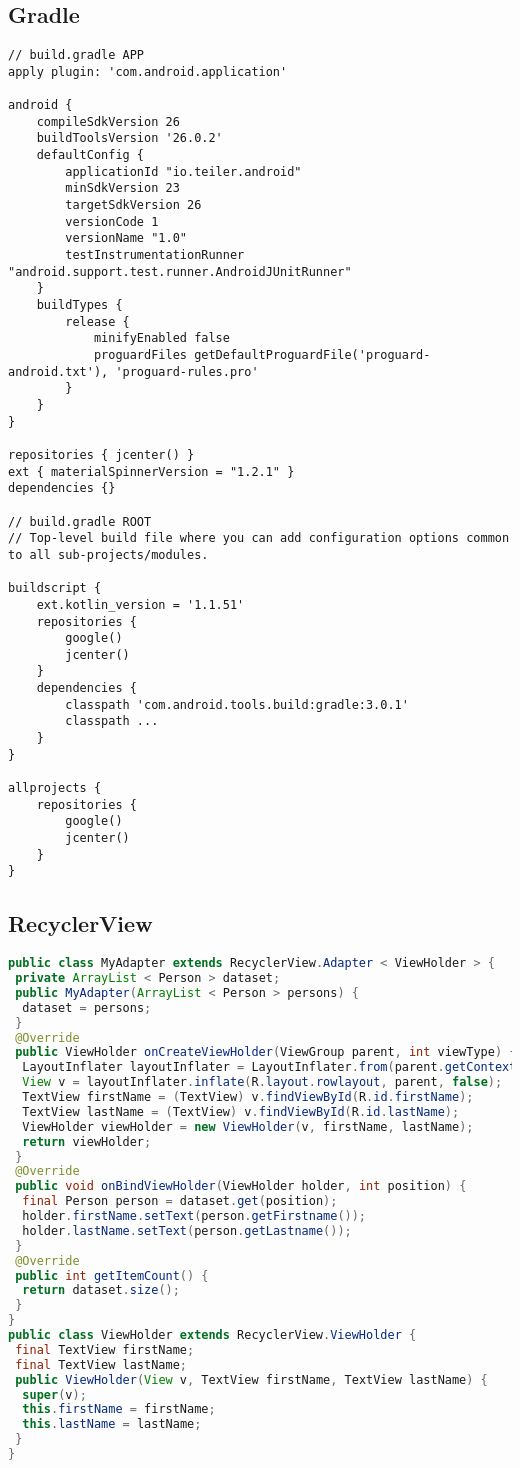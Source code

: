 \subsection{Gradle}

\begin{lstlisting}
// build.gradle APP
apply plugin: 'com.android.application'

android {
    compileSdkVersion 26
    buildToolsVersion '26.0.2'
    defaultConfig {
        applicationId "io.teiler.android"
        minSdkVersion 23
        targetSdkVersion 26
        versionCode 1
        versionName "1.0"
        testInstrumentationRunner "android.support.test.runner.AndroidJUnitRunner"
    }
    buildTypes {
        release {
            minifyEnabled false
            proguardFiles getDefaultProguardFile('proguard-android.txt'), 'proguard-rules.pro'
        }
    }
}

repositories { jcenter() }
ext { materialSpinnerVersion = "1.2.1" }
dependencies {}

// build.gradle ROOT
// Top-level build file where you can add configuration options common to all sub-projects/modules.

buildscript {
    ext.kotlin_version = '1.1.51'
    repositories {
        google()
        jcenter()
    }
    dependencies {
        classpath 'com.android.tools.build:gradle:3.0.1'
        classpath ...
    }
}

allprojects {
    repositories {
        google()
        jcenter()
    }
}
\end{lstlisting}

\subsection{RecyclerView}

\begin{lstlisting}[language=java]
public class MyAdapter extends RecyclerView.Adapter < ViewHolder > {
 private ArrayList < Person > dataset;
 public MyAdapter(ArrayList < Person > persons) {
  dataset = persons;
 }
 @Override
 public ViewHolder onCreateViewHolder(ViewGroup parent, int viewType) {
  LayoutInflater layoutInflater = LayoutInflater.from(parent.getContext());
  View v = layoutInflater.inflate(R.layout.rowlayout, parent, false);
  TextView firstName = (TextView) v.findViewById(R.id.firstName);
  TextView lastName = (TextView) v.findViewById(R.id.lastName);
  ViewHolder viewHolder = new ViewHolder(v, firstName, lastName);
  return viewHolder;
 }
 @Override
 public void onBindViewHolder(ViewHolder holder, int position) {
  final Person person = dataset.get(position);
  holder.firstName.setText(person.getFirstname());
  holder.lastName.setText(person.getLastname());
 }
 @Override
 public int getItemCount() {
  return dataset.size();
 }
}
public class ViewHolder extends RecyclerView.ViewHolder {
 final TextView firstName;
 final TextView lastName;
 public ViewHolder(View v, TextView firstName, TextView lastName) {
  super(v);
  this.firstName = firstName;
  this.lastName = lastName;
 }
}
\end{lstlisting}
